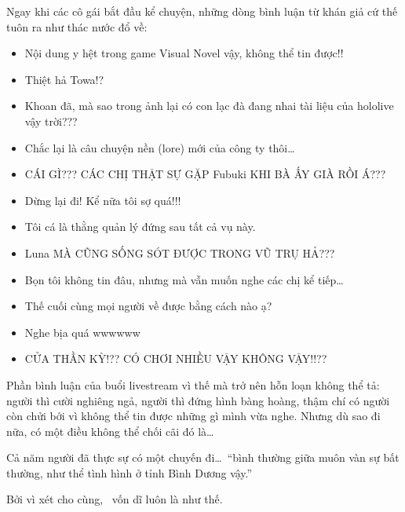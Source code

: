 \documentclass[../main.tex]{subfiles}
\begin{document}
Ngay khi các cô gái bắt đầu kể chuyện, những dòng bình luận từ khán giả cứ thế tuôn ra như thác nước đổ về:

\begin{itemize}
  \item Nội dung y hệt trong game Visual Novel vậy, không thể tin được!!
  \item Thiệt hả Towa!?
  \item Khoan đã, mà sao trong ảnh lại có con lạc đà đang nhai tài liệu của hololive vậy trời???
  \item Chắc lại là câu chuyện nền (lore) mới của công ty thôi\dots
  \item CÁI GÌ??? CÁC CHỊ THẬT SỰ GẶP Fubuki KHI BÀ ẤY GIÀ RỒI Á???
  \item Dừng lại đi! Kể nữa tôi sợ quá!!!
  \item Tôi cá là thằng quản lý đứng sau tất cả vụ này.
  \item Luna MÀ CŨNG SỐNG SÓT ĐƯỢC TRONG VŨ TRỤ HẢ???
  \item Bọn tôi không tin đâu, nhưng mà vẫn muốn nghe các chị kể tiếp\dots
  \item Thế cuối cùng mọi người về được bằng cách nào ạ?
  \item Nghe bịa quá wwwwww
  \item CỬA THẦN KỲ!?? CÓ CHƠI NHIỀU VẬY KHÔNG VẬY!!??
\end{itemize}

Phần bình luận của buổi livestream vì thế mà trở nên hỗn loạn không thể tả: người thì cười nghiêng ngả, người thì đứng hình bàng hoàng, thậm chí có người còn chửi bới vì không thể tin được những gì mình vừa nghe. Nhưng dù sao đi nữa, có một điều không thể chối cãi đó là\dots

Cả năm người đã thực sự có một chuyến đi\dots\ ``bình thường giữa muôn vàn sự bất thường, như thể tình hình ở tỉnh Bình Dương vậy.''

Bởi vì xét cho cùng, \hll\ vốn dĩ luôn là như thế.
\end{document}
